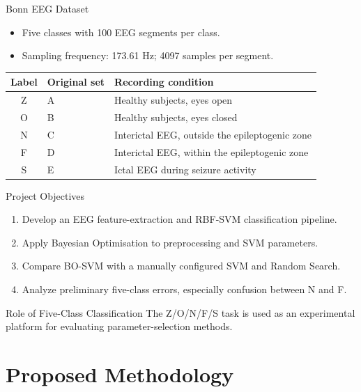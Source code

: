 \documentclass{beamer}
\begin{document}
\begin{frame}{Bonn EEG Dataset}
  \begin{itemize}
    \item Five classes with 100 EEG segments per class.
    \item Sampling frequency: 173.61 Hz; 4097 samples per segment.
  \end{itemize}

  \begin{table}
    \centering
    \small
    \begin{tabular}{clp{7.2cm}}
      \toprule
      Label & Original set & Recording condition \\
      \midrule
      Z & A & Healthy subjects, eyes open \\
      O & B & Healthy subjects, eyes closed \\
      N & C & Interictal EEG, outside the epileptogenic zone \\
      F & D & Interictal EEG, within the epileptogenic zone \\
      S & E & Ictal EEG during seizure activity \\
      \bottomrule
    \end{tabular}
  \end{table}

\end{frame}

\begin{frame}{Project Objectives}
  \begin{enumerate}
    \item Develop an EEG feature-extraction and RBF-SVM classification pipeline.
    \item Apply Bayesian Optimisation to preprocessing and SVM parameters.
    \item Compare BO-SVM with a manually configured SVM and Random Search.
    \item Analyze preliminary five-class errors, especially confusion between N and F.
  \end{enumerate}

  \begin{block}{Role of Five-Class Classification}
    The Z/O/N/F/S task is used as an experimental platform for evaluating parameter-selection methods.
  \end{block}
\end{frame}

\section{Proposed Methodology}
\end{document}
